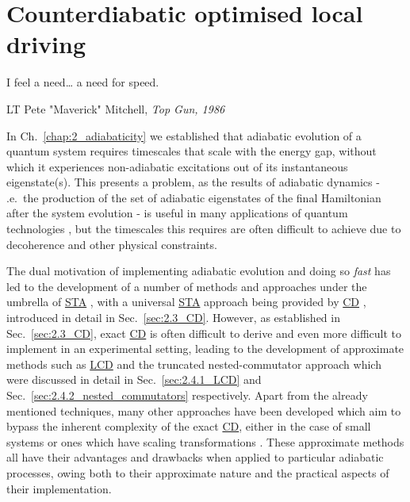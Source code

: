 \documentclass[a4paper,oneside,11pt]{book}
\newcommand{\acrref}[1]{\hyperref[acr:#1]{#1}}
\begin{document}
\chapter{Counterdiabatic optimised local driving}\label{chap:4_COLD}

\epigraph{I feel a need… a need for speed.}{LT Pete "Maverick" Mitchell, \emph{Top Gun, 1986}}

In Ch.~\ref{chap:2_adiabaticity} we established that adiabatic evolution of a quantum system requires timescales that scale with the energy gap, without which it experiences non-adiabatic excitations out of its instantaneous eigenstate(s). This presents a problem, as the results of adiabatic dynamics - \@i.e.~the production of the set of adiabatic eigenstates of the final Hamiltonian after the system evolution - is useful in many applications of quantum technologies \cite{dimitrova_many-body_2023, campo_more_2014, ebadi_quantum_2022}, but the timescales this requires are often difficult to achieve due to decoherence and other physical constraints. 

The dual motivation of implementing adiabatic evolution and doing so \emph{fast} has led to the development of a number of methods and approaches under the umbrella of \acrref{STA} \cite{guery-odelin_shortcuts_2019, torrontegui_chapter_2013}, with a universal \acrref{STA} approach being provided by \acrref{CD} \cite{berry_transitionless_2009, demirplak_adiabatic_2003}, introduced in detail in Sec.~\ref{sec:2.3_CD}. However, as established in Sec.~\ref{sec:2.3_CD}, exact \acrref{CD} is often difficult to derive and even more difficult to implement in an experimental setting, leading to the development of approximate methods such as \acrref{LCD} \cite{sels_minimizing_2017} and the truncated nested-commutator approach \cite{claeys_floquet-engineering_2019} which were discussed in detail in Sec.~\ref{sec:2.4.1_LCD} and Sec.~\ref{sec:2.4.2_nested_commutators} respectively. Apart from the already mentioned techniques, many other approaches \cite{saberi_adiabatic_2014, campbell_shortcut_2015, whitty_quantum_2020} have been developed which aim to bypass the inherent complexity of the exact \acrref{CD}, either in the case of small systems or ones which have scaling transformations \cite{del_campo_shortcuts_2013, deffner_classical_2014, deng_superadiabatic_2018}. These approximate methods all have their advantages and drawbacks when applied to particular adiabatic processes, owing both to their approximate nature and the practical aspects of their implementation.  
\end{document}
